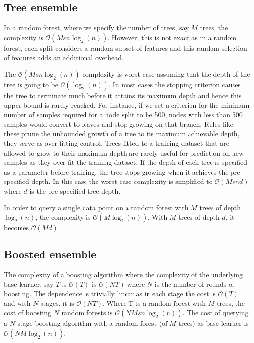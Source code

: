 \subsection{Tree ensemble}

In a random forest, where we specify the number of trees, say $M$ trees, the complexity is $\mathcal{O}(Msn\log_{2}(n))$. However, this is not exact as in a random forest, each split considers a random subset of features and this random selection of features adds an additional overhead.  

The $\mathcal{O}(Msn\log_{2}(n))$ complexity is worst-case assuming that the depth of the tree is going to be $\mathcal{O}(\log_{2}(n))$. In most cases the stopping criterion causes the tree to terminate much before it attains its maximum depth and hence this upper bound is rarely reached. For instance, if we set a criterion for the minimum number of samples required for a node split to be 500, nodes with less than 500 samples would convert to leaves and stop growing on that branch. Rules like these prune the unbounded growth of a tree to its maximum achievable depth, they serve as over fitting control. Trees fitted to a training dataset that are allowed to grow to their maximum depth are rarely useful for prediction on new samples as they over fit the training dataset. If the depth of each tree is specified as a parameter before training, the tree stops growing when it achieves the pre-specified depth. In this case the worst case complexity is simplified to $\mathcal{O}(Msnd)$ where $d$ is the pre-specified tree depth.

In order to query a single data point on a random forest with $M$ trees of depth $\log_{2}(n)$, the complexity is $\mathcal{O}(M\log_{2}(n))$. With $M$ trees of depth $d$, it becomes $\mathcal{O}(Md)$.

\subsection{Boosted ensemble}

The complexity of a boosting algorithm where the complexity of the underlying base learner, say $T$ is $\mathcal{O}(T)$ is $\mathcal{O}(NT)$ where $N$ is the number of rounds of boosting. The dependence is trivially linear as in each stage the cost is $\mathcal{O}(T)$ and with $N$ stages, it is $\mathcal{O}(NT)$. Where T is a random forest with $M$ trees, the cost of boosting $N$ random forests is $\mathcal{O}(NMsn\log_{2}(n))$. The cost of querying a $N$ stage boosting algorithm with a random forest (of $M$ trees) as base learner is $\mathcal{O}(NM\log_{2}(n))$.  



 